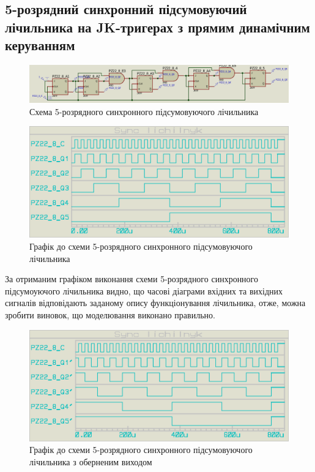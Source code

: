\documentclass{article}
\begin{document}
\begin{normalsize}
	\section*{5-розрядний синхронний підсумовуючий лічильника на JK-тригерах з прямим динамічним керуванням}	
	\begin{figure}[H]
		\centering
		\includegraphics[scale=0.25]{s5}	
		\caption{Схема 5-розрядного синхронного підсумовуючого лічильника}
	\end{figure}
	
	\begin{figure}[H]
		\centering
		\includegraphics[scale=0.25]{g51}	
		\caption{Графік до схеми 5-розрядного синхронного підсумовуючого лічильника}
	\end{figure}

За отриманим графіком виконання схеми 5-розрядного синхронного підсумоуючого лічильника  видно, що часові діаграми вхідних та вихідних сигналів відповідають заданому опису функціонування лічильника, отже, можна зробити виновок, що моделювання виконано правильно.

	\begin{figure}[H]
		\centering
		\includegraphics[scale=0.25]{g52}	
		\caption{Графік до схеми 5-розрядного синхронного підсумовуючого лічильника з оберненим виходом}
	\end{figure}
	

\end{normalsize}
\end{document}
